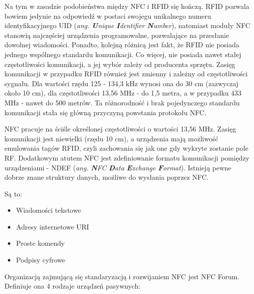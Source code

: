 Na tym w zasadzie podobieństwa między NFC i RFID się kończą. RFID pozwala bowiem jedynie na odpowiedź w postaci swojegu unikalnego numeru identyfikacyjnego UID (\textit{ang. \textbf{U}nique \textbf{I}dentifier \textbf{N}umber}), natomiast moduły NFC stanowią najczęściej urządzenia programowalne, pozwalające na przesłanie dowolnej wiadomości. Ponadto, kolejną różnicą jest fakt, że RFID nie posiada jednego wspólnego standardu komunikacji. Co więcej, nie posiada nawet stałej częstotliwości komunikacji, a jej wybór zależy od producenta sprzętu. Zasięg komunikacji w przypadku RFID również jest zmienny i zależny od częstotliwości sygnału. Dla wartości rzędu 125 - 134,3 kHz wynosi ona do 30 cm (zazwyczaj około 10 cm), dla częstotliwości 13,56 MHz - do 1,5 metra, a w przypadku 433 MHz - nawet do 500 metrów. Ta różnorodność i brak pojedynczego standardu komunikacji stała się główną przyczyną powstania protokołu NFC.

NFC pracuje na ściśle określonej częstotliwości o wartości 13,56 MHz. Zasięg komunikacji jest niewielki (rzędu 10 cm), a urządzenia mają możliwość emulowania tagów RFID, czyli zachowania się jak one gdy wykryte zostanie pole RF. Dodatkowym atutem NFC jest zdefiniowanie formatu komunikacji pomiędzy urządzeniami - NDEF (\textit{ang. \textbf{N}FC \textbf{D}ata \textbf{E}xchange \textbf{F}ormat}). Istnieją pewne dobrze znane struktury danych, możliwe do wysłania poprzez NFC.

 Są to:

\begin{itemize}
\item Wiadomości tekstowe
\item Adresy internetowe URI
\item Proste komendy
\item Podpisy cyfrowe
\end{itemize}

Organizacją zajmującą się standaryzacją i rozwijaniem NFC jest NFC Forum. Definiuje ona 4 rodzaje urządzeń pasywnych:

